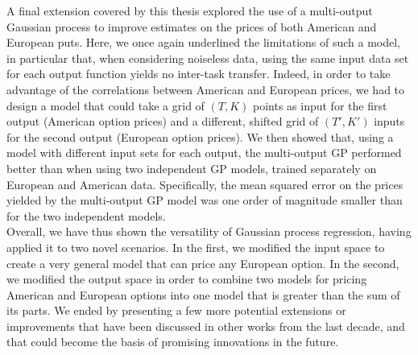 \documentclass[a4paper,12pt]{article}
\begin{document}
A final extension covered by this thesis explored the use of a multi-output Gaussian process to improve estimates on the prices of both American and European puts. Here, we once again underlined the limitations of such a model, in particular that, when considering noiseless data, using the same input data set for each output function yields no inter-task transfer. Indeed, in order to take advantage of the correlations between American and European prices, we had to design a model that could take a grid of $(T, K)$ points as input for the first output (American option prices) and a different, shifted grid of $(T', K')$ inputs for the second output (European option prices). We then showed that, using a model with different input sets for each output, the multi-output GP performed better than when using two independent GP models, trained separately on European and American data. Specifically, the mean squared error on the prices yielded by the multi-output GP model was one order of magnitude smaller than for the two independent models.\\
Overall, we have thus shown the versatility of Gaussian process regression, having applied it to two novel scenarios. In the first, we modified the input space to create a very general model that can price any European option. In the second, we modified the output space in order to combine two models for pricing American and European options into one model that is greater than the sum of its parts. We ended by presenting a few more potential extensions or improvements that have been discussed in other works from the last decade, and that could become the basis of promising innovations in the future.


\newpage



\newpage

\appendix

\end{document}
